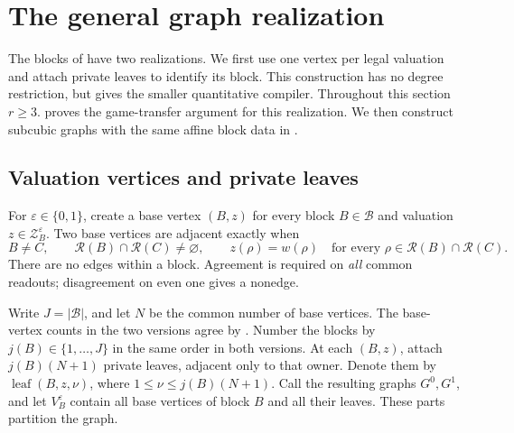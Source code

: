 \documentclass[11pt]{article}
\theoremstyle{definition}
\begin{document}
\section{The general graph realization}\label{general:section}

The blocks of  have two realizations. We first use
one vertex per legal valuation and attach private leaves to identify
its block. This construction has no degree restriction, but gives the
smaller quantitative compiler. Throughout this section \(r\ge3\).
 proves the game-transfer argument for this
realization. We then construct subcubic graphs with the same affine block
data in .

\subsection{Valuation vertices and private leaves}

For \(\varepsilon\in\{0,1\}\), create a base vertex \((B,z)\) for every
block \(B\in\mathcal B\) and valuation \(z\in\mathcal Z_B^\varepsilon\). Two base vertices
are adjacent exactly when
\begin{equation}\label{general:adjacency}
 B\ne C,\qquad
 \mathcal R(B)\cap\mathcal R(C)\ne\varnothing,\qquad
 z(\rho)=w(\rho)\quad
 \text{for every }\rho\in\mathcal R(B)\cap\mathcal R(C).
\end{equation}
There are no edges within a block. Agreement is required on
\emph{all} common readouts; disagreement on even one gives a nonedge.

Write \(J=\left\lvert{\mathcal B}\right\rvert\), and let \(N\) be the common number of base
vertices. The base-vertex counts in the two versions agree by
.
Number the blocks by \(j(B)\in\{1,\ldots,J\}\) in the same order
in both versions. At each \((B,z)\), attach \(j(B)(N+1)\) private
leaves, adjacent only to that owner. Denote them by
\(\operatorname{leaf}(B,z,\nu)\), where
\(1\le\nu\le j(B)(N+1)\). Call the resulting graphs \(G^0,G^1\),
and let \(V_B^\varepsilon\) contain all base vertices of block \(B\) and
all their leaves. These parts partition the graph.
\end{document}
